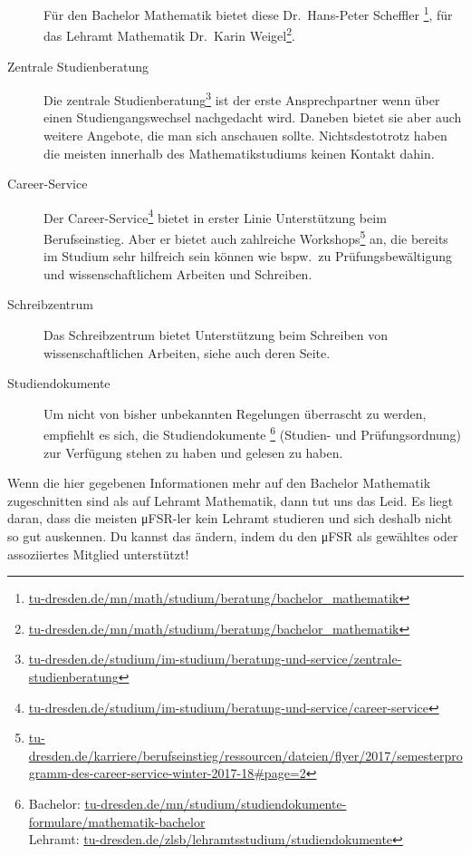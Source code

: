 \documentclass{scrartcl}
\begin{document}
\begin{description}
    Für den Bachelor Mathematik bietet diese Dr.\ Hans-Peter Scheffler
    \footnote{\url{tu-dresden.de/mn/math/studium/beratung/bachelor_mathematik}}, für das Lehramt Mathematik Dr.\ Karin Weigel\footnote{\url{tu-dresden.de/mn/math/studium/beratung/bachelor_mathematik}}.
  \item[Zentrale Studienberatung] Die zentrale Studienberatung\footnote{\url{tu-dresden.de/studium/im-studium/beratung-und-service/zentrale-studienberatung}} ist der erste Ansprechpartner wenn über einen Studiengangswechsel nachgedacht wird. Daneben bietet sie aber auch weitere Angebote,
    die man sich anschauen sollte.
    Nichtsdestotrotz haben die meisten innerhalb des Mathematikstudiums keinen Kontakt dahin.
  \item[Career-Service] Der Career-Service\footnote{\url{tu-dresden.de/studium/im-studium/beratung-und-service/career-service}} bietet in erster Linie Unterstützung beim Berufseinstieg.
    Aber er bietet auch zahlreiche Workshops\footnote{\url{tu-dresden.de/karriere/berufseinstieg/ressourcen/dateien/flyer/2017/semesterprogramm-des-career-service-winter-2017-18\#page=2}} an, die bereits im Studium
    sehr hilfreich sein können wie bspw.\ zu Prüfungsbewältigung und
    wissenschaftlichem Arbeiten und Schreiben.
  \item[Schreibzentrum] Das Schreibzentrum bietet Unterstützung beim Schreiben von wissenschaftlichen Arbeiten, siehe auch deren Seite.
  \item[Studiendokumente] Um nicht von bisher unbekannten Regelungen
    überrascht zu werden, empfiehlt es sich, die Studiendokumente
    \footnote{Bachelor: \url{tu-dresden.de/mn/studium/studiendokumente-formulare/mathematik-bachelor}\\
    Lehramt: \url{tu-dresden.de/zlsb/lehramtsstudium/studiendokumente}}
    (Studien- und Prüfungsordnung) zur Verfügung stehen zu haben und
    gelesen zu haben.
  
\end{description}
Wenn die hier gegebenen Informationen mehr auf den Bachelor
Mathematik zugeschnitten sind als auf Lehramt Mathematik,
dann tut uns das Leid. Es liegt daran, dass
die meisten μFSR-ler kein Lehramt studieren und sich deshalb
nicht so gut auskennen. Du kannst das ändern, indem du den
μFSR als gewähltes oder assoziiertes Mitglied unterstützt!
\end{document}
